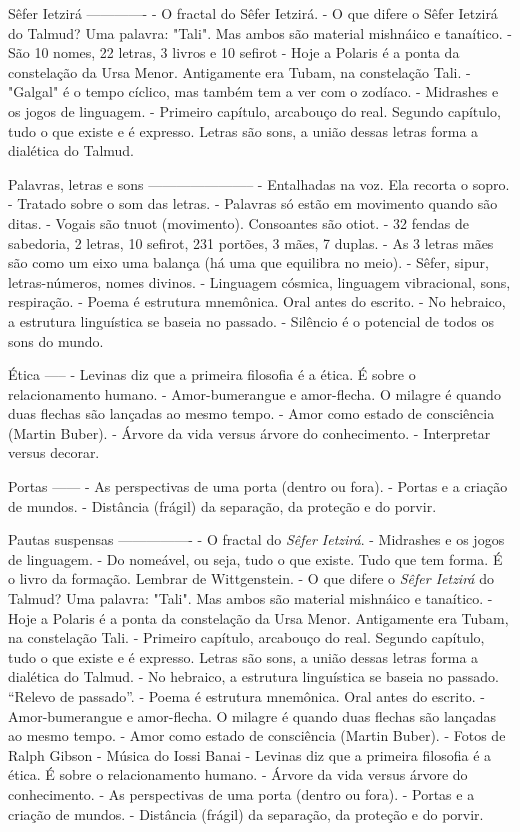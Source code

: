 Sêfer Ietzirá
-------------
- O fractal do Sêfer Ietzirá.
- O que difere o Sêfer Ietzirá do Talmud? Uma palavra: "Tali". Mas ambos são material mishnáico e tanaítico.
- São 10 nomes, 22 letras, 3 livros e 10 sefirot
- Hoje a Polaris é a ponta da constelação da Ursa Menor. Antigamente era Tubam, na constelação Tali.
- "Galgal" é o tempo cíclico, mas também tem a ver com o zodíaco.
- Midrashes e os jogos de linguagem.
- Primeiro capítulo, arcabouço do real. Segundo capítulo, tudo o que existe e é expresso. Letras são sons, a união dessas letras forma a dialética do Talmud.

Palavras, letras e sons
-----------------------
- Entalhadas na voz. Ela recorta o sopro.
- Tratado sobre o som das letras.
- Palavras só estão em movimento quando são ditas.
- Vogais são tnuot (movimento). Consoantes são otiot.
- 32 fendas de sabedoria, 2 letras, 10 sefirot, 231 portões, 3 mães, 7 duplas.
- As 3 letras mães são como um eixo uma balança (há uma que equilibra no meio).
- Sêfer, sipur, letras-números, nomes divinos.
- Linguagem cósmica, linguagem vibracional, sons, respiração.
- Poema é estrutura mnemônica. Oral antes do escrito.
- No hebraico, a estrutura linguística se baseia no passado.
- Silêncio é o potencial de todos os sons do mundo.

Ética
-----
- Levinas diz que a primeira filosofia é a ética. É sobre o relacionamento humano.
- Amor-bumerangue e amor-flecha. O milagre é quando duas flechas são lançadas ao mesmo tempo.
- Amor como estado de consciência (Martin Buber).
- Árvore da vida versus árvore do conhecimento.
- Interpretar versus decorar.

Portas
------
- As perspectivas de uma porta (dentro ou fora).
- Portas e a criação de mundos.
- Distância (frágil) da separação, da proteção e do porvir.

Pautas suspensas
----------------
- O fractal do \textit{Sêfer Ietzirá}.
- Midrashes e os jogos de linguagem.
- Do nomeável, ou seja, tudo o que existe. Tudo que tem forma. É o livro da formação. Lembrar de Wittgenstein.
- O que difere o \textit{Sêfer Ietzirá} do Talmud? Uma palavra: "Tali". Mas ambos são material mishnáico e tanaítico.
- Hoje a Polaris é a ponta da constelação da Ursa Menor. Antigamente era Tubam, na constelação Tali.
- Primeiro capítulo, arcabouço do real. Segundo capítulo, tudo o que existe e é expresso. Letras são sons, a união dessas letras forma a dialética do Talmud.
- No hebraico, a estrutura linguística se baseia no passado. ``Relevo de passado''.
- Poema é estrutura mnemônica. Oral antes do escrito.
- Amor-bumerangue e amor-flecha. O milagre é quando duas flechas são lançadas ao mesmo tempo.
- Amor como estado de consciência (Martin Buber).
- Fotos de Ralph Gibson
- Música do Iossi Banai
- Levinas diz que a primeira filosofia é a ética. É sobre o relacionamento humano.
- Árvore da vida versus árvore do conhecimento.
- As perspectivas de uma porta (dentro ou fora).
- Portas e a criação de mundos.
- Distância (frágil) da separação, da proteção e do porvir.